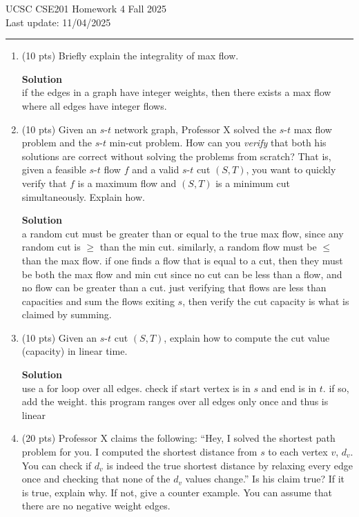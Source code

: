 \documentclass[letterpaper,12pt]{article}
\newcommand{\solution}{\textbf{Solution}\\}
\begin{document}
\noindent
 UCSC CSE201 Homework 4 \hfill Fall 2025 \\
Last update: 11/04/2025 \\
 \rule{\textwidth}{0.5pt}



\enlargethispage*{1.5cm}




\begin{enumerate}

\item (10 pts) Briefly explain the integrality of max flow. 

\solution
if the edges in a graph have integer weights, then there exists a max flow where all edges have integer flows.

\newpage
\item (10 pts) Given an $s$-$t$ network graph, Professor X solved the $s$-$t$ max flow problem and the $s$-$t$ min-cut problem. How  can you \emph{verify} that both his solutions are correct without solving the problems from scratch? That is, given a feasible $s$-$t$ flow $f$ and a valid $s$-$t$ cut $(S, T)$, you want to quickly verify that $f$ is a maximum flow and $(S, T)$ is a minimum cut simultaneously. Explain how.

\solution
a random cut must be greater than or equal to the true max flow, since any random cut is \(\geq\) than the min cut. similarly, a random flow must be \(\leq\) than the max flow. if one finds a flow that is equal to a cut, then they must be both the max flow and min cut since no cut can be less than a flow, and no flow can be greater than a cut. just verifying that flows are less than capacities and sum the flows exiting \(s\), then verify the cut capacity is what is claimed by summing. 



\newpage
\item (10 pts)  Given an $s$-$t$ cut $(S, T)$, explain how to compute the cut value (capacity) in linear time. 
   
\solution

use a for loop over all edges. check if start vertex is in \(s\) and end is in \(t\). if so, add the weight. this program ranges over all edges only once and thus is linear



\newpage
\item (20 pts) Professor X claims the following: ``Hey, I solved the shortest path problem for you. I computed the shortest distance from $s$ to each vertex $v$, $d_v$. You can check if $d_v$ is indeed the true shortest distance by relaxing every edge once and checking that none of the $d_v$ values change.'' Is his claim true? If it is true, explain why. If not, give a counter example. You can assume that there are no negative weight edges. 


\end{enumerate}
\end{document}
